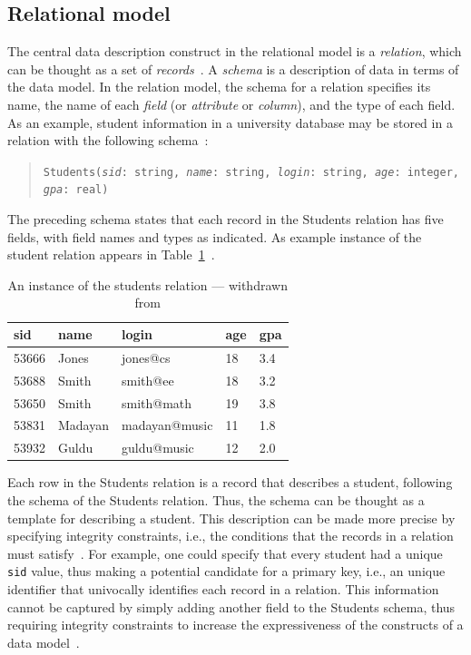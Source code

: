 \subsection{Relational model}
\label{sec:relational-model}
The central data description construct in the relational model is a \emph{relation},
which can be thought as a set of
\emph{records}~\cite{ramakrishnan2003database}.
A \emph{schema} is a description of data in terms of the data model. In the
relation model, the schema for a relation specifies its name, the name of each
\emph{field} (or \emph{attribute} or \emph{column}), and the type of each
field. As an example, student information in a university database may be stored
in a relation with the following schema~\cite{ramakrishnan2003database}:
\begin{quote}
\texttt{Students(\emph{sid}: string, \emph{name}: string, \emph{login}: string, \emph{age}: integer, \emph{gpa}: real)}
\end{quote}
%
The preceding schema states that each record in the Students relation has five
fields, with field names and types as indicated. As example instance of the
student relation appears in Table~\ref{tab:relational-model-example}~\cite{ramakrishnan2003database}.
%
\begingroup
\renewcommand{\arraystretch}{0.9} %
\begin{table}[hbt!]
\centering
\caption{An instance of the students relation --- withdrawn from \cite{ramakrishnan2003database}}
\label{tab:relational-model-example}
\begin{tabular}{@{}lllll@{}}
\toprule
\textbf{sid} & \textbf{name} & \textbf{login} & \textbf{age} & \textbf{gpa} \\ \midrule
53666        & Jones         & jones@cs       & 18           & 3.4          \\
53688        & Smith         & smith@ee       & 18           & 3.2          \\
53650        & Smith         & smith@math     & 19           & 3.8          \\
53831        & Madayan       & madayan@music  & 11           & 1.8          \\
53932        & Guldu         & guldu@music    & 12           & 2.0          \\ \bottomrule
\end{tabular}
\end{table}
\endgroup

Each row in the Students relation is a record that describes a student,
following the schema of the Students relation. Thus, the schema can be thought
as a template for describing a student. This description can be made more
precise by specifying integrity constraints, i.e., the conditions that the
records in a relation must satisfy~\cite{ramakrishnan2003database}.
For example, one could specify that every
student had a unique \texttt{sid} value, thus making a potential candidate for a
primary key, i.e., an unique identifier that univocally identifies each record
in a relation. This information cannot be captured by simply adding another
field to the Students schema, thus requiring integrity constraints to increase
the expressiveness of the constructs of a data model~\cite{ramakrishnan2003database}.

